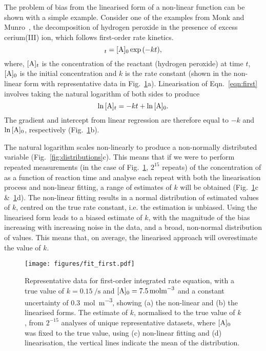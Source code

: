 \documentclass[reprint,superscriptaddress,nobibnotes,amsmath,amssymb]{revtex4-2}
\begin{document}
The problem of bias from the linearised form of a non-linear function can be shown with a simple example. 
Consider one of the examples from Monk and Munro~\cite{monk_math_2010}, the decomposition of hydrogen peroxide  in the presence of excess cerium(III) ion, which follows first-order rate kinetics.
%
\begin{equation}
    [\ce{A}]_t = [\ce{A}]_0\exp{(-kt)},
    \label{eqn:first}
\end{equation}
%
where, $[\ce{A}]_t$ is the concentration of the reactant  (hydrogen peroxide) at time $t$, $[\ce{A}]_0$ is the initial concentration and $k$ is the rate constant (shown in the non-linear form with representative data in Fig.~\ref{fig:fit_first}a).
Linearisation of Eqn.~\ref{eqn:first} involves taking the natural logarithm of both sides to produce
%
\begin{equation}
    \ln{[\ce{A}]_t} = -kt + \ln{[\ce{A}]_0}.
\end{equation}
%
The gradient and intercept from linear regression are therefore equal to $-k$ and $\ln{[\ce{A}]_0}$, respectively (Fig.~\ref{fig:fit_first}b).

The natural logarithm scales non-linearly to produce a non-normally distributed variable (Fig.~\ref{fig:distributions}c).
This means that if we were to perform repeated measurements (in the case of Fig.~\ref{fig:fit_first}, $2^{15}$ repeats) of the concentration of  as a function of reaction time and analyse each repeat with both the linearisation process and non-linear fitting, a range of estimates of $k$ will be obtained (Fig.~\ref{fig:fit_first}c \&~\ref{fig:fit_first}d).
The non-linear fitting results in a normal distribution of estimated values of $k$, centred on the true rate constant, i.e. the estimation is unbiased. 
Using the linearised form leads to a biased estimate of $k$, with the magnitude of the bias increasing with increasing noise in the data, and a broad, non-normal distribution of values. 
This means that, on average, the linearised approach will overestimate the value of $k$. 
%
\begin{figure}
  \texttt{[image: figures/fit\_first.pdf]}
  \caption{
    Representative data for first-order integrated rate equation, with a true value of $k=\SI{0.15}{\per\second}$ and $[\ce{A}]_0=\SI{7.5}{\mol\m^{-3}}$ and a constant uncertainty of \SI{0.3}{\mol\m^{-3}}, showing (a) the non-linear and (b) the linearised forms. 
    The estimate of $k$, normalised to the true value of $k$, from $2^{-15}$ analyses of unique representative datasets, where $[\ce{A}]_0$ was fixed to the true value, using (c) non-linear fitting and (d) linearisation, the vertical lines indicate the mean of the distribution. 
    }
  \label{fig:fit_first}
\end{figure}
%
\end{document}
